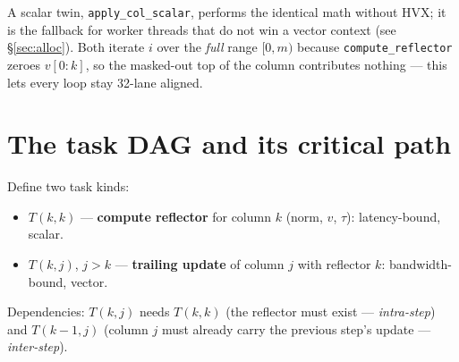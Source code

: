 \documentclass[11pt]{article}
\newcommand{\code}[1]{\texttt{\small #1}}
\begin{document}
\noindent A scalar twin, \code{apply\_col\_scalar}, performs the identical math without
HVX; it is the fallback for worker threads that do not win a vector context (see
\S\ref{sec:alloc}). Both iterate $i$ over the \emph{full} range $[0,m)$ because
\code{compute\_reflector} zeroes $v[0{:}k]$, so the masked-out top of the column
contributes nothing --- this lets every loop stay 32-lane aligned.

\section{The task DAG and its critical path}
Define two task kinds:
\begin{itemize}\itemsep1pt
  \item $T(k,k)$ --- \textbf{compute reflector} for column $k$ (norm, $v$, $\tau$): latency-bound, scalar.
  \item $T(k,j)$, $j>k$ --- \textbf{trailing update} of column $j$ with reflector $k$: bandwidth-bound, vector.
\end{itemize}
Dependencies: $T(k,j)$ needs $T(k,k)$ (the reflector must exist --- \emph{intra-step})
and $T(k{-}1,j)$ (column $j$ must already carry the previous step's update ---
\emph{inter-step}).
\end{document}
